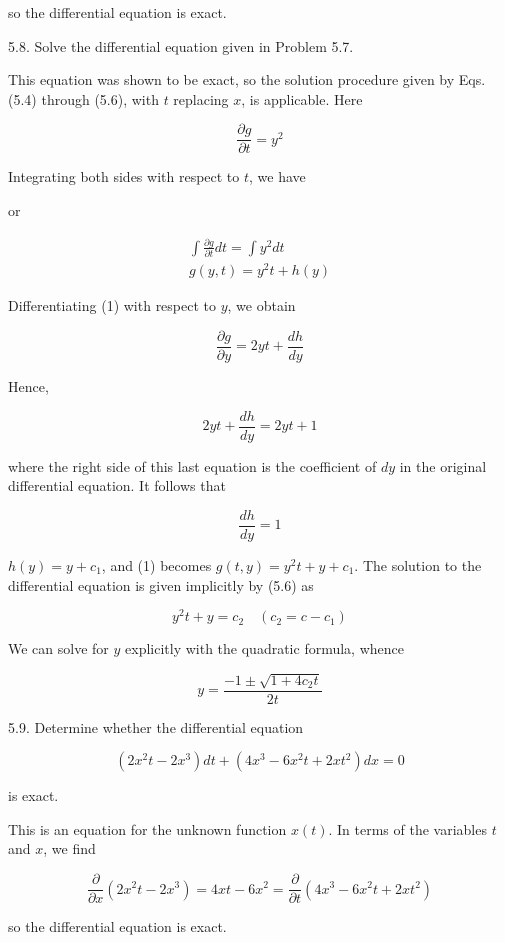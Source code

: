 \documentclass[10pt]{article}
\begin{document}
so the differential equation is exact.

5.8. Solve the differential equation given in Problem 5.7.

This equation was shown to be exact, so the solution procedure given by Eqs. (5.4) through (5.6), with $t$ replacing $x$, is applicable. Here

$$
\frac{\partial g}{\partial t}=y^{2}
$$

Integrating both sides with respect to $t$, we have

or


\begin{gather*}
\int \frac{\partial g}{\partial t} d t=\int y^{2} d t \\
g(y, t)=y^{2} t+h(y) \tag{1}
\end{gather*}


Differentiating (1) with respect to $y$, we obtain

$$
\frac{\partial g}{\partial y}=2 y t+\frac{d h}{d y}
$$

Hence,

$$
2 y t+\frac{d h}{d y}=2 y t+1
$$

where the right side of this last equation is the coefficient of $d y$ in the original differential equation. It follows that

$$
\frac{d h}{d y}=1
$$

$h(y)=y+c_{1}$, and (1) becomes $g(t, y)=y^{2} t+y+c_{1}$. The solution to the differential equation is given implicitly by (5.6) as


\begin{equation*}
y^{2} t+y=c_{2} \quad\left(c_{2}=c-c_{1}\right) \tag{2}
\end{equation*}


We can solve for $y$ explicitly with the quadratic formula, whence

$$
y=\frac{-1 \pm \sqrt{1+4 c_{2} t}}{2 t}
$$

5.9. Determine whether the differential equation

$$
\left(2 x^{2} t-2 x^{3}\right) d t+\left(4 x^{3}-6 x^{2} t+2 x t^{2}\right) d x=0
$$

is exact.

This is an equation for the unknown function $x(t)$. In terms of the variables $t$ and $x$, we find

$$
\frac{\partial}{\partial x}\left(2 x^{2} t-2 x^{3}\right)=4 x t-6 x^{2}=\frac{\partial}{\partial t}\left(4 x^{3}-6 x^{2} t+2 x t^{2}\right)
$$

so the differential equation is exact.
\end{document}
